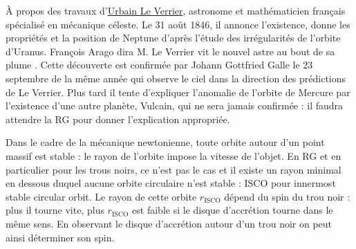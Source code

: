 \begin{funfact}
À propos des travaux d'\href{https://fr.wikipedia.org/wiki/Urbain_Le_Verrier}{Urbain Le Verrier}, astronome et mathématicien français spécialisé en mécanique céleste.
Le 31 août 1846, il annonce l'existence, donne les propriétés et la position de Neptune d'après l'étude des irrégularités de l'orbite d'Uranus.
François Arago dira \og M. Le Verrier vit le nouvel astre au bout de sa plume \fg{}. 
Cette découverte est confirmée par Johann Gottfried Galle le 23 septembre de la même année qui observe le ciel dans la direction des prédictions de Le Verrier.
Plus tard il tente d'expliquer l'anomalie de l'orbite de Mercure par l'existence d'une autre planète, Vulcain, qui ne sera jamais confirmée : il faudra attendre la RG pour donner l'explication appropriée.

\noindent
Dans le cadre de la mécanique newtonienne, toute orbite autour d'un point massif est stable : le rayon de l'orbite impose la vitesse de l'objet.
En RG et en particulier pour les trous noirs, ce n'est pas le cas et il existe un rayon minimal en dessous duquel aucune orbite circulaire n'est stable : ISCO pour innermost stable circular orbit.
Le rayon de cette orbite $r_\mathrm{ISCO}$ dépend du spin du trou noir : plus il tourne vite, plus $r_\mathrm{ISCO}$ est faible si le disque d'accrétion tourne dans le même sens.
En observant le disque d'accrétion autour d'un trou noir on peut ainsi déterminer son spin.
\end{funfact}

\newpage